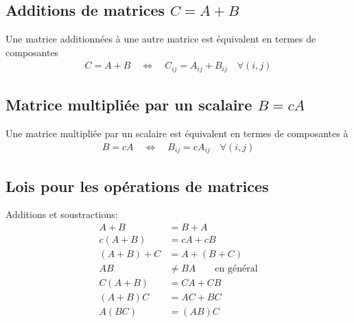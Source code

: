 \subsection{Additions de matrices $C = A + B $}

Une matrice additionnées à une autre matrice est équivalent en termes de composantes
\begin{align}
C  = A + B
\quad \Leftrightarrow \quad
C_{ij} = A_{ij} + B_{ij} \quad \forall (i,j)
\end{align}

\subsection{Matrice multipliée par un scalaire $B = cA$}

Une matrice multipliée par un scalaire est équivalent en termes de composantes à 
\begin{align}
B = cA
\quad \Leftrightarrow \quad
B_{ij} = c A_{ij} \quad \forall (i,j)
\end{align}


\newpage
\subsection{Lois pour les opérations de matrices}

Additions et soustractions:
\begin{align}
A + B &= B + A     \\
c(A + B) &= cA + cB  \\
(A + B) + C &= A + (B + C) \\
AB &\neq BA \quad\quad \text{en général} \\
C(A + B) &= CA + CB \\
(A + B)C &= AC + BC \\
A(BC) &= (AB)C 
\end{align}

